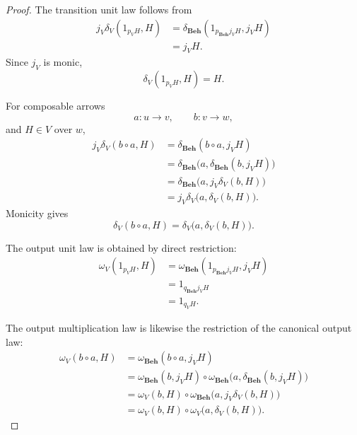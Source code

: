 \begin{proof}
    The transition unit law follows from
    \[
    \begin{aligned}
        j_V\delta_V(1_{p_VH},H)
        &=
        \delta_{\mathbf{Beh}}
        (1_{p_{\mathbf{Beh}}j_VH},j_VH)
        \\
        &=
        j_VH.
    \end{aligned}
    \]
    Since \(j_V\) is monic,
    \[
        \delta_V(1_{p_VH},H)=H.
    \]

    For composable arrows
    \[
        a:u\to v,
        \qquad
        b:v\to w,
    \]
    and \(H\in V\) over \(w\),
    \[
    \begin{aligned}
        j_V\delta_V(b\circ a,H)
        &=
        \delta_{\mathbf{Beh}}(b\circ a,j_VH)
        \\
        &=
        \delta_{\mathbf{Beh}}
        \bigl(
            a,
            \delta_{\mathbf{Beh}}(b,j_VH)
        \bigr)
        \\
        &=
        \delta_{\mathbf{Beh}}
        \bigl(
            a,
            j_V\delta_V(b,H)
        \bigr)
        \\
        &=
        j_V\delta_V
        \bigl(
            a,
            \delta_V(b,H)
        \bigr).
    \end{aligned}
    \]
    Monicity gives
    \[
        \delta_V(b\circ a,H)
        =
        \delta_V
        \bigl(
            a,
            \delta_V(b,H)
        \bigr).
    \]

    The output unit law is obtained by direct restriction:
    \[
    \begin{aligned}
        \omega_V(1_{p_VH},H)
        &=
        \omega_{\mathbf{Beh}}
        (1_{p_{\mathbf{Beh}}j_VH},j_VH)
        \\
        &=
        1_{q_{\mathbf{Beh}}j_VH}
        \\
        &=
        1_{q_VH}.
    \end{aligned}
    \]

    The output multiplication law is likewise the restriction of the
    canonical output law:
    \[
    \begin{aligned}
        \omega_V(b\circ a,H)
        &=
        \omega_{\mathbf{Beh}}(b\circ a,j_VH)
        \\
        &=
        \omega_{\mathbf{Beh}}(b,j_VH)
        \circ
        \omega_{\mathbf{Beh}}
        \bigl(
            a,
            \delta_{\mathbf{Beh}}(b,j_VH)
        \bigr)
        \\
        &=
        \omega_V(b,H)
        \circ
        \omega_{\mathbf{Beh}}
        \bigl(
            a,
            j_V\delta_V(b,H)
        \bigr)
        \\
        &=
        \omega_V(b,H)
        \circ
        \omega_V
        \bigl(
            a,
            \delta_V(b,H)
        \bigr).
    \end{aligned}
    \]


\end{proof}
